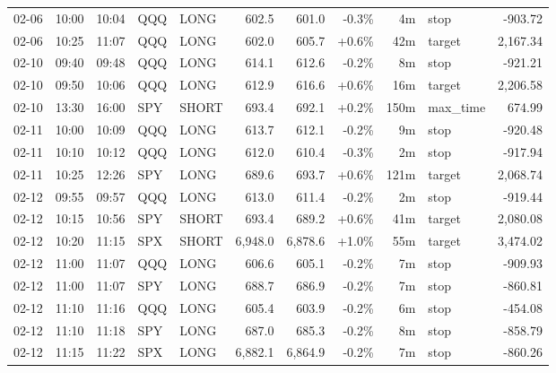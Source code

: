 \documentclass[11pt,a4paper,twoside]{article}
\begin{document}
\begin{center}
\begin{longtable}{>{\color{txtmain}}l l l l l r r r r >{\color{txtmain}}l r}
02-06 & 10:00 & 10:04 & QQQ & LONG & 602.5 & 601.0 & \textcolor{lossred}{-0.3\%} & 4m & stop & \textcolor{lossred}{-903.72} \\
02-06 & 10:25 & 11:07 & QQQ & LONG & 602.0 & 605.7 & \textcolor{wingreen}{+0.6\%} & 42m & target & \textcolor{wingreen}{2,167.34} \\
02-10 & 09:40 & 09:48 & QQQ & LONG & 614.1 & 612.6 & \textcolor{lossred}{-0.2\%} & 8m & stop & \textcolor{lossred}{-921.21} \\
02-10 & 09:50 & 10:06 & QQQ & LONG & 612.9 & 616.6 & \textcolor{wingreen}{+0.6\%} & 16m & target & \textcolor{wingreen}{2,206.58} \\
02-10 & 13:30 & 16:00 & SPY & SHORT & 693.4 & 692.1 & \textcolor{wingreen}{+0.2\%} & 150m & max\_time & \textcolor{wingreen}{674.99} \\
02-11 & 10:00 & 10:09 & QQQ & LONG & 613.7 & 612.1 & \textcolor{lossred}{-0.2\%} & 9m & stop & \textcolor{lossred}{-920.48} \\
02-11 & 10:10 & 10:12 & QQQ & LONG & 612.0 & 610.4 & \textcolor{lossred}{-0.3\%} & 2m & stop & \textcolor{lossred}{-917.94} \\
02-11 & 10:25 & 12:26 & SPY & LONG & 689.6 & 693.7 & \textcolor{wingreen}{+0.6\%} & 121m & target & \textcolor{wingreen}{2,068.74} \\
02-12 & 09:55 & 09:57 & QQQ & LONG & 613.0 & 611.4 & \textcolor{lossred}{-0.2\%} & 2m & stop & \textcolor{lossred}{-919.44} \\
02-12 & 10:15 & 10:56 & SPY & SHORT & 693.4 & 689.2 & \textcolor{wingreen}{+0.6\%} & 41m & target & \textcolor{wingreen}{2,080.08} \\
02-12 & 10:20 & 11:15 & SPX & SHORT & 6,948.0 & 6,878.6 & \textcolor{wingreen}{+1.0\%} & 55m & target & \textcolor{wingreen}{3,474.02} \\
02-12 & 11:00 & 11:07 & QQQ & LONG & 606.6 & 605.1 & \textcolor{lossred}{-0.2\%} & 7m & stop & \textcolor{lossred}{-909.93} \\
02-12 & 11:00 & 11:07 & SPY & LONG & 688.7 & 686.9 & \textcolor{lossred}{-0.2\%} & 7m & stop & \textcolor{lossred}{-860.81} \\
02-12 & 11:10 & 11:16 & QQQ & LONG & 605.4 & 603.9 & \textcolor{lossred}{-0.2\%} & 6m & stop & \textcolor{lossred}{-454.08} \\
02-12 & 11:10 & 11:18 & SPY & LONG & 687.0 & 685.3 & \textcolor{lossred}{-0.2\%} & 8m & stop & \textcolor{lossred}{-858.79} \\
02-12 & 11:15 & 11:22 & SPX & LONG & 6,882.1 & 6,864.9 & \textcolor{lossred}{-0.2\%} & 7m & stop & \textcolor{lossred}{-860.26} \\

\end{longtable}
\end{center}
\end{document}
